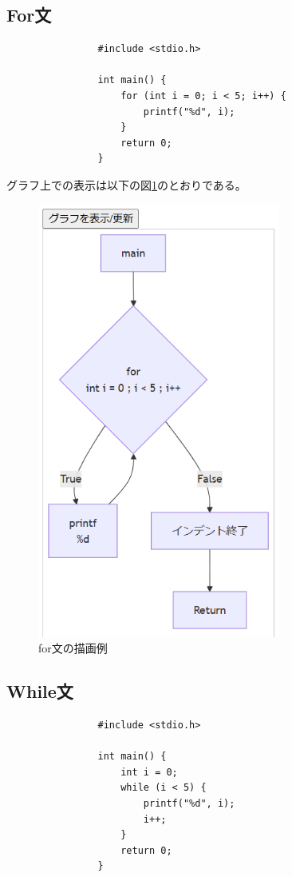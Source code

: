 \documentclass{cssspaper}
\begin{document}
            \subsection{For文}
            \begin{lstlisting}
                #include <stdio.h>

                int main() {
                    for (int i = 0; i < 5; i++) {
                        printf("%d", i);
                    }
                    return 0;
                }
            \end{lstlisting}
            グラフ上での表示は以下の図\ref{fig:for}のとおりである。

            \begin{figure}[h]
                \centering
                \includegraphics[width=8cm]{for.png}
                \caption{for文の描画例}
                \label{fig:for}
            \end{figure}

            \subsection{While文}
            \begin{lstlisting}
                #include <stdio.h>

                int main() {
                    int i = 0;
                    while (i < 5) {
                        printf("%d", i);
                        i++;
                    }
                    return 0;
                }
            \end{lstlisting}
\end{document}
